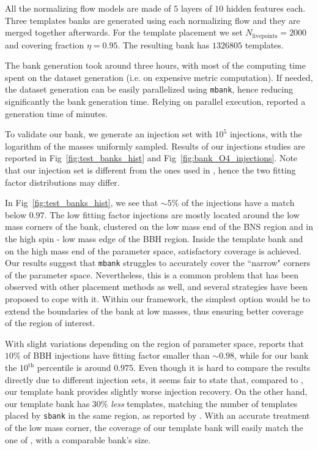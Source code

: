 \documentclass[twocolumn,showpacs,preprintnumbers,nofootinbib,prd,
superscriptaddress,10pt]{revtex4-2}
\begin{document}
All the normalizing flow models are made of $5$ layers of $10$ hidden features each.
Three templates banks are generated using each normalizing flow and they are merged together afterwards.
For the template placement we set $N_\text{livepoints} = 2000$ and covering fraction $\eta = 0.95$.
The resulting bank has $1326805$ templates.

The bank generation took around three hours, with most of the computing time spent on the dataset generation (i.e. on expensive metric computation). If needed, the dataset generation can be easily parallelized using \texttt{mbank}, hence reducing significantly the bank generation time.
Relying on parallel execution, \cite{Sakon:2022ibh} reported a generation time of minutes.

To validate our bank, we generate an injection set with $10^5$ injections, with the logarithm of the masses uniformly sampled.
Results of our injections studies are reported in Fig~\ref{fig:test_banks_hist} and Fig~\ref{fig:bank_O4_injections}.
Note that our injection set is different from the ones used in \cite{Sakon:2022ibh}, hence the two fitting factor distributions may differ.

In Fig~\ref{fig:test_banks_hist}, we see that $\sim 5\%$ of the injections have a match below $0.97$. The low fitting factor injections are mostly located around the low mass corners of the bank, clustered on the low mass end of the BNS region and in the high spin - low mass edge of the BBH region.
Inside the template bank and on the high mass end of the parameter space, satisfactory coverage is achieved.
Our results suggest that \texttt{mbank} struggles to accurately cover the ``narrow" corners of the parameter space. Nevertheless, this is a common problem that has been observed with other placement methods as well, and several strategies have been proposed to cope with it. Within our framework, the simplest option would be to extend the boundaries of the bank at low masses, thus ensuring better coverage of the region of interest.

With slight variations depending on the region of parameter space, \cite{Sakon:2022ibh} reports that $10\%$ of BBH injections have fitting factor smaller than $\sim 0.98$, while for our bank the $10^\text{th}$ percentile is around $0.975$.
Even though it is hard to compare the results directly due to different injection sets, it seems fair to state that, compared to \cite{Sakon:2022ibh}, our template bank provides slightly worse injection recovery.
On the other hand, our template bank has $30\%$ {\it less} templates, matching the number of templates placed by \texttt{sbank} in the same region, as reported by \cite{Sakon:2022ibh}. With an accurate treatment of the low mass corner, the coverage of our template bank will easily match the one of \cite{Sakon:2022ibh}, with a comparable bank's size.
\end{document}

